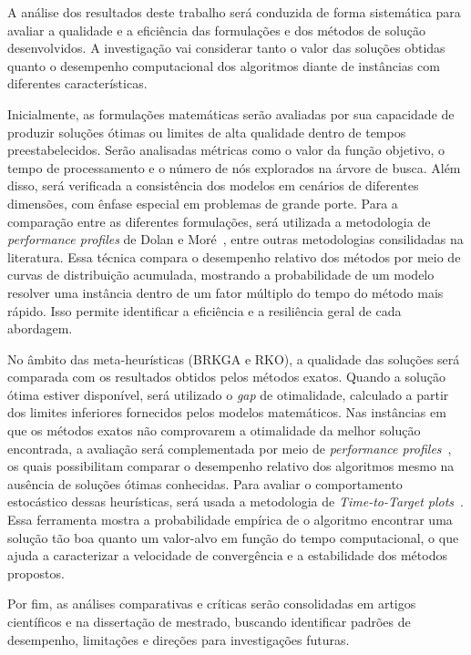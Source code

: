 
A análise dos resultados deste trabalho será conduzida de forma sistemática para avaliar a qualidade e a eficiência das formulações e dos métodos de solução desenvolvidos. A investigação vai considerar tanto o valor das soluções obtidas quanto o desempenho computacional dos algoritmos diante de instâncias com diferentes características.

Inicialmente, as formulações matemáticas serão avaliadas por sua capacidade de produzir soluções ótimas ou limites de alta qualidade dentro de tempos preestabelecidos. Serão analisadas métricas como o valor da função objetivo, o tempo de processamento e o número de nós explorados na árvore de busca. Além disso, será verificada a consistência dos modelos em cenários de diferentes dimensões, com ênfase especial em problemas de grande porte. Para a comparação entre as diferentes formulações, será utilizada a metodologia de \emph{performance profiles} de Dolan e Moré~\cite{Dolan2002}, entre outras metodologias consilidadas na literatura. Essa técnica compara o desempenho relativo dos métodos por meio de curvas de distribuição acumulada, mostrando a probabilidade de um modelo resolver uma instância dentro de um fator múltiplo do tempo do método mais rápido. Isso permite identificar a eficiência e a resiliência geral de cada abordagem.

No âmbito das meta-heurísticas (BRKGA e RKO), a qualidade das soluções será comparada com os resultados obtidos pelos métodos exatos. Quando a solução ótima estiver disponível, será utilizado o \emph{gap} de otimalidade, calculado a partir dos limites inferiores fornecidos pelos modelos matemáticos. Nas instâncias em que os métodos exatos não comprovarem a otimalidade da melhor solução encontrada, a avaliação será complementada por meio de \emph{performance profiles}~\cite{Dolan2002}, os quais possibilitam comparar o desempenho relativo dos algoritmos mesmo na ausência de soluções ótimas conhecidas. Para avaliar o comportamento estocástico dessas heurísticas, será usada a metodologia de \emph{Time-to-Target plots}~\cite{aiex2007}. Essa ferramenta mostra a probabilidade empírica de o algoritmo encontrar uma solução tão boa quanto um valor-alvo em função do tempo computacional, o que ajuda a caracterizar a velocidade de convergência e a estabilidade dos métodos propostos.

Por fim, as análises comparativas e críticas serão consolidadas em artigos científicos e na dissertação de mestrado, buscando identificar padrões de desempenho, limitações e direções para investigações futuras.